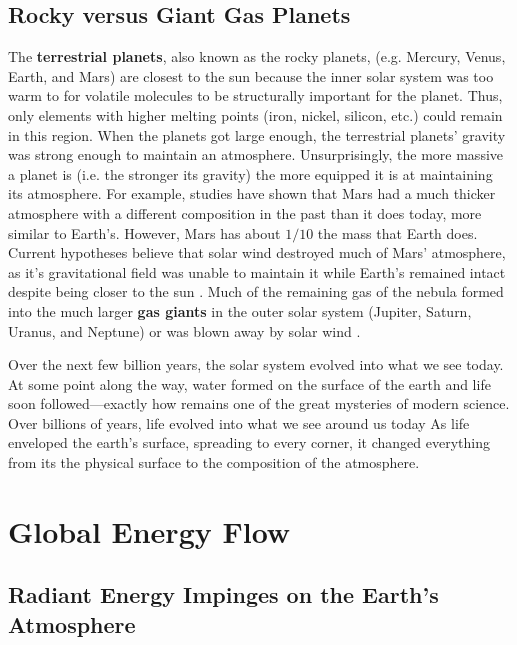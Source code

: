 \subsection{Rocky versus Giant Gas Planets}

    The \textbf{terrestrial planets}, also known as the rocky planets, (e.g. Mercury, Venus, Earth, and Mars) are closest to the sun because the inner solar system was too warm to for volatile molecules to be structurally important for the planet. Thus, only elements with higher melting points (iron, nickel, silicon, etc.) could remain in this region. When the planets got large enough, the terrestrial planets' gravity was strong enough to maintain an atmosphere. Unsurprisingly, the more massive a planet is (i.e. the stronger its gravity) the more equipped it is at maintaining its atmosphere. For example, studies have shown that Mars had a much thicker atmosphere with a different composition in the past than it does today, more similar to Earth's. However, Mars has about $1/10$ the mass that Earth does. Current hypotheses believe that solar wind destroyed much of Mars' atmosphere, as it's gravitational field was unable to maintain it while Earth's remained intact despite being closer to the sun \citep{owen1992composition}. Much of the remaining gas of the nebula formed into the much larger \textbf{gas giants} in the outer solar system (Jupiter, Saturn, Uranus, and Neptune) or was blown away by solar wind \citep{hayashi1985formation}.

    Over the next few billion years, the solar system evolved into what we see today. At some point along the way, water formed on the surface of the earth and life soon followed---exactly how remains one of the great mysteries of modern science. Over billions of years, life evolved into what we see around us today \citep{bell2015potentially} As life enveloped the earth's surface, spreading to every corner, it changed everything from its the physical surface to the composition of the atmosphere.


    \section{\label{sec:energy_flow}Global Energy Flow}
		
\subsection{Radiant Energy Impinges on the Earth's Atmosphere}

